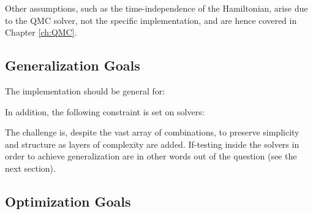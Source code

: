 Other assumptions, such as the time-independence of the Hamiltonian, arise due to the QMC solver, not the specific implementation, and are hence covered in Chapter \ref{ch:QMC}.

\subsection{Generalization Goals}
\label{sec:genGoals}

The implementation should be general for:

 
In addition, the following constraint is set on solvers:



The challenge is, despite the vast array of combinations, to preserve simplicity and structure as layers of complexity are added. If-testing inside the solvers in order to achieve generalization are in other words out of the question (see the next section).

\subsection{Optimization Goals}
\label{sec:optGoals}

